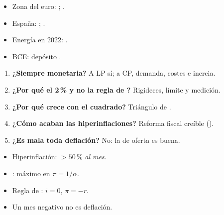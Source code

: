 \documentclass{article}
\begin{document}
\begin{columnas}
\anexorepaso
{}
\begin{itemize}
\item Zona del euro: ; .
\item España: ; .
\item Energía en 2022: .
\item BCE: depósito .
\end{itemize}
\begin{enumerate}
\item \textbf{¿Siempre monetaria?} A LP sí; a CP, demanda, costes e inercia.
\item \textbf{¿Por qué el 2\,\% y no la regla de ?} Rigideces, límite y medición.
\item \textbf{¿Por qué crece con el cuadrado?} Triángulo de .
\item \textbf{¿Cómo acaban las hiperinflaciones?} Reforma fiscal creíble ().
\item \textbf{¿Es mala toda deflación?} No: la de oferta es buena.
\end{enumerate}
\begin{trampa}
\begin{itemize}
\item Hiperinflación: $>50$\,\% \emph{al mes}.
\item {}: máximo en $\pi=1/\alpha$.
\item Regla de : $i=0$, $\pi=-r$.
\item Un mes negativo no es deflación.
\end{itemize}
\end{trampa}

\end{columnas}
\end{document}
